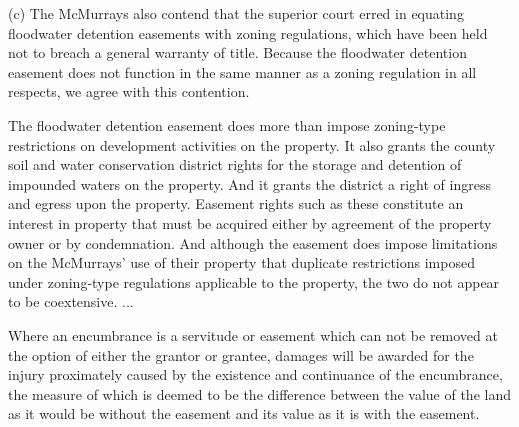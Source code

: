 (c) The McMurrays also contend that the superior court erred in equating
floodwater detention easements with zoning regulations, which have been held
not to breach a general warranty of title. Because the floodwater detention
easement does not function in the same manner as a zoning regulation in all
respects, we agree with this contention. 

The floodwater detention easement does more than impose zoning-type restrictions
on development activities on the property. It also grants the county soil and
water conservation district rights for the storage and detention of impounded
waters on the property. And it grants the district a right of ingress and
egress upon the property. Easement rights such as these constitute an interest
in property that must be acquired either by agreement of the property owner or
by condemnation. And although the easement does impose limitations on the
McMurrays' use of their property that duplicate restrictions imposed under
zoning-type regulations applicable to the property, the two do not appear to be
coextensive. ... 

Where an encumbrance is a servitude or easement which can not be removed at the
option of either the grantor or grantee, damages will be awarded for the injury
proximately caused by the existence and continuance of the encumbrance, the
measure of which is deemed to be the difference between the value of the land
as it would be without the easement and its value as it is with the easement.


